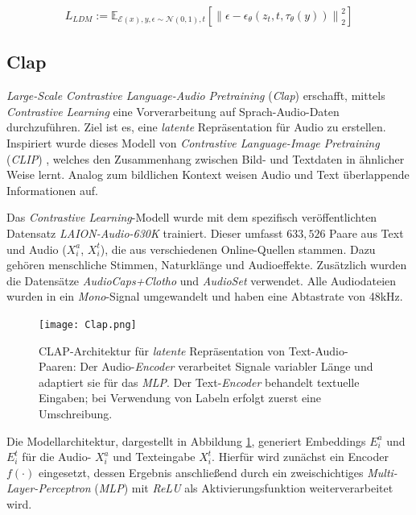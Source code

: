 \documentclass[
  a4paper,  %
  twoside,  %
  bibliography=totoc,
  headsepline,
  cleardoublepage=empty,
  parskip=half,
  draft=false
]{scrbook}
\begin{document}
{\begin{equation}
L_{L D M}:=\mathbb{E}_{\mathcal{E}(x), y, \epsilon \sim \mathcal{N}(0,1), t}\left[\left\|\epsilon-\epsilon_\theta\left(z_t, t, \tau_\theta(y)\right)\right\|_2^2\right]
\end{equation}

\subsection{Clap}

\emph{Large-Scale Contrastive Language-Audio Pretraining} (\emph{Clap}) \cite{wu_large-scale_2023} erschafft, mittels \emph{Contrastive Learning} eine Vorverarbeitung auf Sprach-Audio-Daten durchzuführen. Ziel ist es, eine \emph{latente} Repräsentation für Audio zu erstellen. Inspiriert wurde dieses Modell von \emph{Contrastive Language-Image Pretraining} (\emph{CLIP}) \cite{radford_learning_2021}, welches den Zusammenhang zwischen Bild- und Textdaten in ähnlicher Weise lernt. Analog zum bildlichen Kontext weisen Audio und Text überlappende Informationen auf. \cite{wu_large-scale_2023}

Das \emph{Contrastive Learning}-Modell wurde mit dem spezifisch veröffentlichten Datensatz \emph{LAION-Audio-630K} trainiert. Dieser umfasst $633,526$ Paare aus Text und Audio ($X_i^a$, $X_i^t$), die aus verschiedenen Online-Quellen stammen. Dazu gehören menschliche Stimmen, Naturklänge und Audioeffekte. Zusätzlich wurden die Datensätze \emph{AudioCaps+Clotho} \cite{kim_audiocaps_2019} \cite{drossos_clotho_2019} und \emph{AudioSet} \cite{gemmeke_audio_2017} verwendet. Alle Audiodateien wurden in ein \emph{Mono}-Signal umgewandelt und haben eine Abtastrate von 48kHz. \cite{wu_large-scale_2023}

\begin{figure}[h]
  \centering
  \texttt{[image: Clap.png]}
  \caption[Clap Architektur]{CLAP-Architektur für \emph{latente} Repräsentation von Text-Audio-Paaren: Der Audio-\emph{Encoder} verarbeitet Signale variabler Länge und adaptiert sie für das \emph{MLP}. Der Text-\emph{Encoder} behandelt textuelle Eingaben; bei Verwendung von Labeln erfolgt zuerst eine Umschreibung. \cite{wu_large-scale_2023}}
  \label{fig:Clap}
\end{figure} 

Die Modellarchitektur, dargestellt in Abbildung \ref{fig:Clap}, generiert Embeddings $E_i^a$ und $E_i^t$ für die Audio- $X_i^a$ und Texteingabe $X_i^t$. Hierfür wird zunächst ein Encoder $f(\cdot)$ eingesetzt, dessen Ergebnis anschließend durch ein zweischichtiges \emph{Multi-Layer-Perceptron} (\emph{MLP}) mit \emph{ReLU} \cite{agarap_deep_2019} als Aktivierungsfunktion weiterverarbeitet wird. \cite{wu_large-scale_2023}

}
\end{document}
